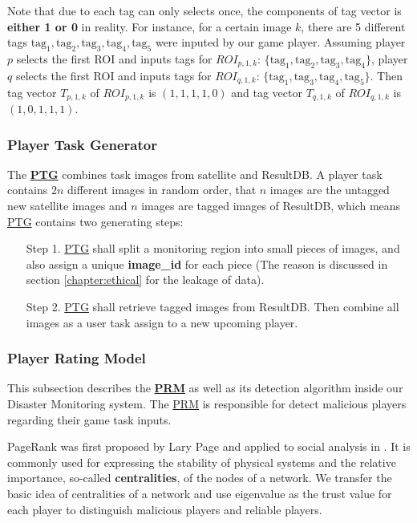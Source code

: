 Note that due to each tag can only selects once, the components of tag vector is \textbf{either 1 or 0} in reality.
For instance, for a certain image $k$,
there are 5 different tags $\text{tag}_1, \text{tag}_2, \text{tag}_3, \text{tag}_4, \text{tag}_5$ were inputed
by our game player.
Assuming player $p$ selects the first ROI and inputs tags for $ROI_{p, 1, k}$: 
$\{\text{tag}_1, \text{tag}_2, \text{tag}_3, \text{tag}_4\}$, 
player $q$ selects the first ROI and inputs tags for $ROI_{q, 1, k}$:
$\{\text{tag}_1, \text{tag}_3, \text{tag}_4, \text{tag}_5\}$. 
Then tag vector $T_{p, 1, k}$ of $ROI_{p, 1, k}$ is $(1, 1, 1, 1, 0)$ and tag vector
$T_{q, 1, k}$ of $ROI_{q, 1, k}$ is $(1, 0, 1, 1, 1)$.

\subsubsection{Player Task Generator}

The \textbf{\hyperref[idx:ptg]{PTG}} combines task images from satellite and ResultDB.
A player task contains $2n$ different images in random order, that $n$ images are
the untagged new satellite images and $n$ images are tagged images of ResultDB, which means
\hyperref[idx:ptg]{PTG} contains two generating steps:

\begin{itemize}
\item [Step 1.] \hyperref[idx:ptg]{PTG} shall split a monitoring region into small pieces of images, 
and also assign a unique \textbf{image\_id} for each piece 
(The reason is discussed in section \ref{chapter:ethical} for the leakage of data).

\item [Step 2.] \hyperref[idx:ptg]{PTG} shall retrieve tagged images from ResultDB. Then combine
all images as a user task assign to a new upcoming player.
\end{itemize}

\subsubsection{Player Rating Model}

This subsection describes the \textbf{\hyperref[idx:prm]{PRM}} as well as its detection algorithm 
inside our Disaster Monitoring system.
The \hyperref[idx:prm]{PRM} is responsible for detect malicious players regarding their game task inputs.

PageRank was first proposed by Lary Page \cite{page1999pagerank} and 
applied to social analysis in \cite{bonacich2001eigenvector}. 
It is commonly used for expressing the stability of physical systems and the relative importance, 
so-called \textbf{centralities}, of the nodes of a network. 
We transfer the basic idea of centralities of a network
and use eigenvalue as the trust value for each player to distinguish malicious players and reliable players.

